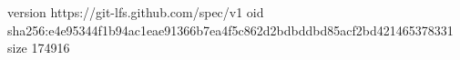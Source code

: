 version https://git-lfs.github.com/spec/v1
oid sha256:e4e95344f1b94ac1eae91366b7ea4f5c862d2bdbddbd85acf2bd421465378331
size 174916
